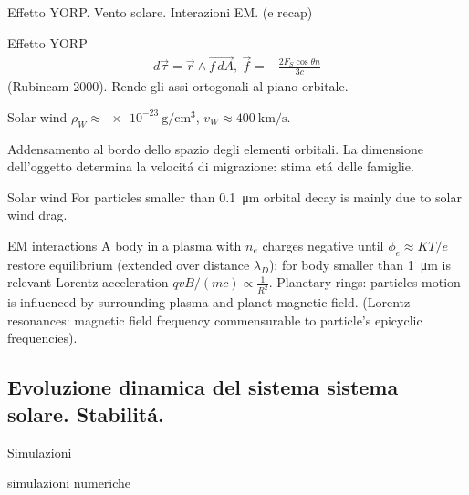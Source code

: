 \begin{wordonframe}{Effetto YORP. Vento solare. Interazioni EM. (e recap)}
\begin{block}{Effetto YORP}
\begin{align*}
d\vec{\tau}=\vec{r}\wedge\vec{f\,dA},\ \vec{f}=-\frac{2F_S\cos{\theta}\hat{n}}{3c}
\end{align*}
(Rubincam 2000). Rende gli assi ortogonali al piano orbitale.
\end{block}
\begin{block}{Solar wind}
$\rho_W\approx\SI{e-23}{\gram\per\cubic\cm}$, $v_W\approx\SI{400}{\kilo\meter\per\second}$.
\end{block}
Addensamento al bordo dello spazio degli elementi orbitali.
La dimensione dell'oggetto determina la velocit\'a di migrazione: stima et\'a delle famiglie.
\begin{block}{Solar wind}
For particles smaller than \SI{0.1}{\micro\meter} orbital decay is mainly due to solar wind drag.
\end{block}
\begin{block}{EM interactions}
A body in a plasma with $n_e$ charges negative until $\phi_e\approx KT/e$ restore equilibrium (extended over distance $\lambda_D$): for body smaller than \SI{1}{\micro\meter} is relevant Lorentz acceleration $qvB/(mc)\propto\frac{1}{R^2}$.
Planetary rings: particles motion is influenced by surrounding plasma and planet magnetic field. (Lorentz resonances: magnetic field frequency commensurable to particle's epicyclic frequencies).
\end{block}
\end{wordonframe}


\subsection{Evoluzione dinamica del sistema sistema solare. Stabilit\'a.}

\begin{frame}{Simulazioni}

\end{frame}
\begin{wordonframe}{simulazioni numeriche}

\end{wordonframe}
        